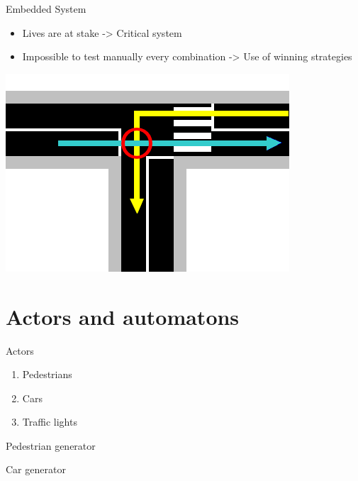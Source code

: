 \documentclass{bredelebeamer}
\begin{document}




\begin{frame}{Embedded System}
 \begin{itemize}
\item Lives are at stake -> Critical system
\item Impossible to test manually every combination -> Use of winning strategies
\end{itemize}
\centering
\includegraphics[scale=0.4]{images/exempleCollision.png}
\end{frame}

\section{Actors and automatons}
\begin{frame}{Actors}
\begin{enumerate}
\item <1-> Pedestrians
\item <2-> Cars
\item <3-> Traffic lights
\end{enumerate}
\end{frame}

\begin{frame}{Pedestrian generator}

\end{frame}

\begin{frame}{Car generator}

\end{frame}
\end{document}
